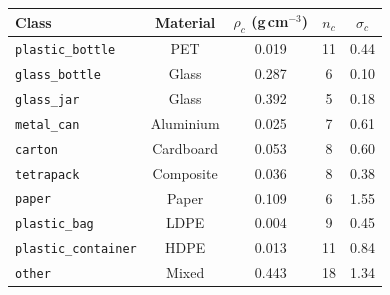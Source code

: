 \begin{table}[!tb]
\centering
\caption{}
\label{tab:densities}
\small
\setlength{\tabcolsep}{4pt}
\begin{tabular}{lcccc}
\toprule
Class & Material & $\rho_c$ (g\,cm$^{-3}$) & $n_c$ & $\sigma_c$ \\
\midrule
\texttt{plastic\_bottle} & PET & 0.019 & 11 & 0.44 \\
\texttt{glass\_bottle} & Glass & 0.287 & 6 & 0.10 \\
\texttt{glass\_jar} & Glass & 0.392 & 5 & 0.18 \\
\texttt{metal\_can} & Aluminium & 0.025 & 7 & 0.61 \\
\texttt{carton} & Cardboard & 0.053 & 8 & 0.60 \\
\texttt{tetrapack} & Composite & 0.036 & 8 & 0.38 \\
\texttt{paper} & Paper & 0.109 & 6 & 1.55 \\
\texttt{plastic\_bag} & LDPE & 0.004 & 9 & 0.45 \\
\texttt{plastic\_container} & HDPE & 0.013 & 11 & 0.84 \\
\texttt{other} & Mixed & 0.443 & 18 & 1.34 \\
\bottomrule
\end{tabular}
\end{table}

